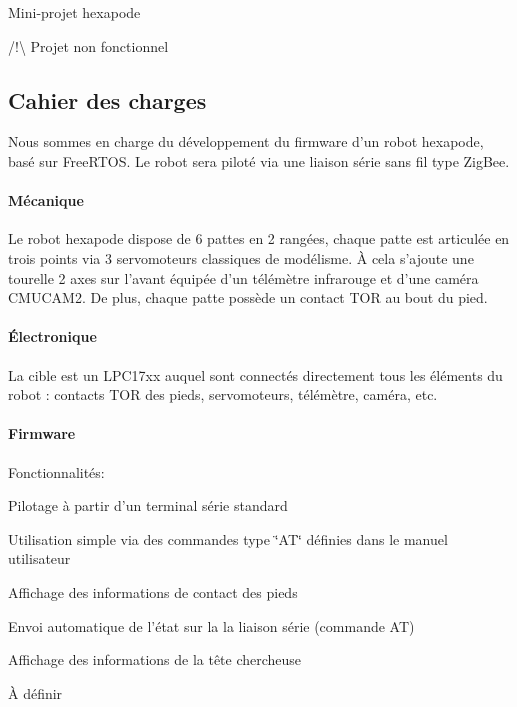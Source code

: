 Mini-\/projet hexapode

/!\textbackslash{} Projet non fonctionnel

\subsection*{Cahier des charges}

Nous sommes en charge du développement du firmware d'un robot hexapode, basé sur Free\-R\-T\-O\-S. Le robot sera piloté via une liaison série sans fil type Zig\-Bee.

\paragraph*{Mécanique}

Le robot hexapode dispose de 6 pattes en 2 rangées, chaque patte est articulée en trois points via 3 servomoteurs classiques de modélisme. À cela s'ajoute une tourelle 2 axes sur l'avant équipée d'un télémètre infrarouge et d'une caméra C\-M\-U\-C\-A\-M2. De plus, chaque patte possède un contact T\-O\-R au bout du pied.

\paragraph*{Électronique}

La cible est un L\-P\-C17xx auquel sont connectés directement tous les éléments du robot \-: contacts T\-O\-R des pieds, servomoteurs, télémètre, caméra, etc.

\paragraph*{Firmware}

Fonctionnalités\-:


\begin{DoxyItemize}
\item Pilotage à partir d'un terminal série standard
\begin{DoxyItemize}
\item Utilisation simple via des commandes type \char`\"{}\-A\-T\char`\"{} définies dans le manuel utilisateur
\end{DoxyItemize}
\item Affichage des informations de contact des pieds
\begin{DoxyItemize}
\item Envoi automatique de l'état sur la la liaison série (commande A\-T)
\end{DoxyItemize}
\item Affichage des informations de la tête chercheuse
\begin{DoxyItemize}
\item À définir
\end{DoxyItemize}
\end{DoxyItemize}

